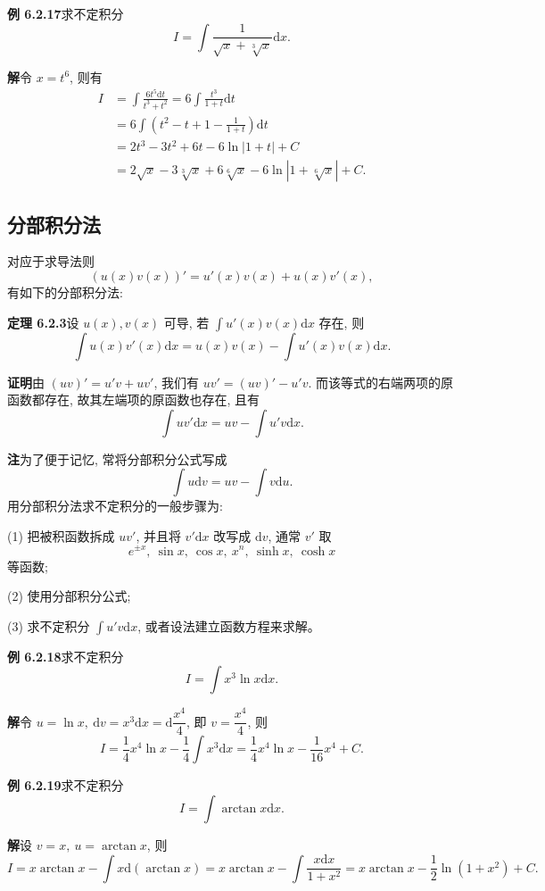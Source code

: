 \documentclass[UTF8,12pt,a4paper,fontset=fandol]{ctexart}
\begin{document}
\noindent\textbf{例 6.2.17}\quad 求不定积分
\[
  I=\int\frac1{\sqrt x+\sqrt[3]x}\mathrm dx.
\]

\noindent\textbf{解}\quad 令 $x=t^6$, 则有
\[
\begin{aligned}
  I
  &=
  \int\frac{6t^5\mathrm dt}{t^3+t^2}
  =
  6\int\frac{t^3}{1+t}\mathrm dt\\
  &=
  6\int\left(t^2-t+1-\frac1{1+t}\right)\mathrm dt\\
  &=
  2t^3-3t^2+6t-6\ln|1+t|+C\\
  &=
  2\sqrt x-3\sqrt[3]x+6\sqrt[6]x-6\ln|1+\sqrt[6]x|+C.
\end{aligned}
\]

\subsection{分部积分法}

对应于求导法则
\[
  (u(x)v(x))'=u'(x)v(x)+u(x)v'(x),
\]
有如下的分部积分法:

\noindent\textbf{定理 6.2.3}\quad 设 $u(x),v(x)$ 可导, 若 $\int u'(x)v(x)\mathrm dx$ 存在, 则
\[
  \int u(x)v'(x)\mathrm dx
  =
  u(x)v(x)-\int u'(x)v(x)\mathrm dx.
\]

\noindent\textbf{证明}\quad 由 $(uv)'=u'v+uv'$, 我们有 $uv'=(uv)'-u'v$. 而该等式的右端两项的原函数都存在, 故其左端项的原函数也存在, 且有
\[
  \int uv'\mathrm dx=uv-\int u'v\mathrm dx.
\]

\noindent\textbf{注}\quad 为了便于记忆, 常将分部积分公式写成
\[
  \int u\mathrm dv=uv-\int v\mathrm du.
\]
用分部积分法求不定积分的一般步骤为:

(1) 把被积函数拆成 $uv'$, 并且将 $v'\mathrm dx$ 改写成 $\mathrm dv$, 通常 $v'$ 取
\[
  e^{\pm x},\ \sin x,\ \cos x,\ x^n,\ \sinh x,\ \cosh x
\]
等函数;

(2) 使用分部积分公式;

(3) 求不定积分 $\int u'v\mathrm dx$, 或者设法建立函数方程来求解。

\noindent\textbf{例 6.2.18}\quad 求不定积分
\[
  I=\int x^3\ln x\mathrm dx.
\]

\noindent\textbf{解}\quad 令 $u=\ln x,\ \mathrm dv=x^3\mathrm dx=\mathrm d\dfrac{x^4}4$, 即 $v=\dfrac{x^4}4$, 则
\[
  I=\frac14x^4\ln x-\frac14\int x^3\mathrm dx
  =
  \frac14x^4\ln x-\frac1{16}x^4+C.
\]

\noindent\textbf{例 6.2.19}\quad 求不定积分
\[
  I=\int\arctan x\mathrm dx.
\]

\noindent\textbf{解}\quad 设 $v=x,\ u=\arctan x$, 则
\[
  I
  =
  x\arctan x-\int x\mathrm d(\arctan x)
  =
  x\arctan x-\int\frac{x\mathrm dx}{1+x^2}
  =
  x\arctan x-\frac12\ln(1+x^2)+C.
\]
\end{document}
